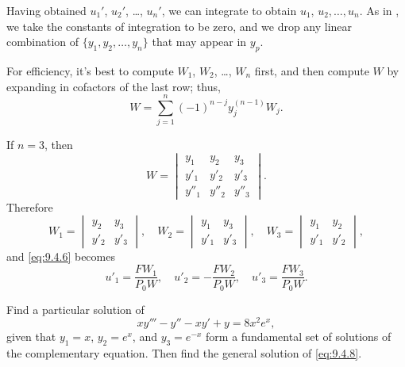 Having obtained $u_1'$, $u_2'$, \dots, $u_n'$, we can integrate  to
obtain $u_1,\,u_2,\dots,u_n$. As in , we
take the constants
of integration to be zero, and we drop any linear combination of
$\{y_1,y_2,\dots,y_n\}$ that may appear in $y_p$.

\medskip

\begin{remark*}
For efficiency, it's best to compute $W_1$, $W_2$, \dots, $W_n$
first, and then compute $W$ by expanding in cofactors of the last row;
thus,
\[
W=\sum_{j=1}^n(-1)^{n-j}y_j^{(n-1)}W_j.
\]
\end{remark*}



If $n=3$, then
\[
W=\begin{vmatrix}
y_1&y_2&y_3 \\
y'_1&y'_2&y'_3 \\
y''_1&y''_2&y''_3
\end{vmatrix}.
\]
Therefore
\[
W_1=\begin{vmatrix}
y_2&y_3 \\
y'_2&y'_3
\end{vmatrix},
\quad W_2=\begin{vmatrix}
y_1&y_3 \\
y'_1&y'_3
\end{vmatrix},
\quad W_3=\begin{vmatrix}
y_1&y_2 \\
y'_1&y'_2
\end{vmatrix},
\]
and  \eqref{eq:9.4.6}  becomes
\begin{equation} \label{eq:9.4.7}
u'_1=\frac{FW_1}{P_0W},\quad u'_2=-\frac{FW_2}{P_0W},\quad
u'_3=\frac{FW_3}{P_0W}.
\end{equation}



\begin{example}\label{example:9.4.1}
 Find a particular solution of
\begin{equation} \label{eq:9.4.8}
xy'''-y''-xy'+y=8x^2e^x,
\end{equation}
given that  $y_1=x$, $y_2=e^x$, and $y_3=e^{-x}$ form a fundamental
set of solutions of the complementary equation. Then find the general
solution of \eqref{eq:9.4.8}.
 \end{example}

